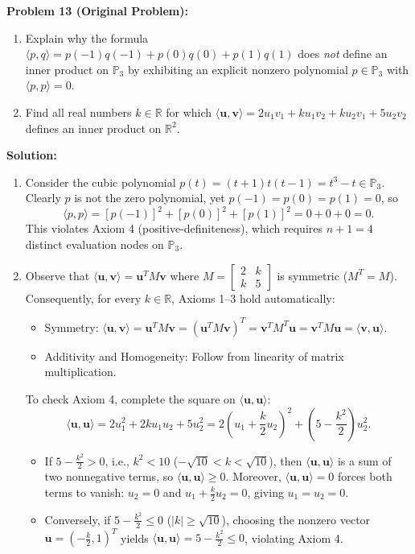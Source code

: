 \documentclass[11pt, letterpaper]{article}
\theoremstyle{definition}
\theoremstyle{remark}
\begin{document}
\medskip

\textbf{Problem 13 (Original Problem):}
\begin{enumerate}[label=(\alph*)]
    \item Explain why the formula $\langle p, q \rangle = p(-1)q(-1) + p(0)q(0) + p(1)q(1)$ does \emph{not} define an inner product on $\mathbb{P}_3$ by exhibiting an explicit nonzero polynomial $p \in \mathbb{P}_3$ with $\langle p, p \rangle = 0$.
    \item Find all real numbers $k \in \mathbb{R}$ for which $\langle \mathbf{u}, \mathbf{v} \rangle = 2u_1v_1 + ku_1v_2 + ku_2v_1 + 5u_2v_2$ defines an inner product on $\mathbb{R}^2$.
\end{enumerate}

\textbf{Solution:}
\begin{enumerate}[label=(\alph*)]
    \item Consider the cubic polynomial $p(t) = (t + 1)t(t - 1) = t^3 - t \in \mathbb{P}_3$. Clearly $p$ is not the zero polynomial, yet $p(-1) = p(0) = p(1) = 0$, so
    \[
    \langle p, p \rangle = [p(-1)]^2 + [p(0)]^2 + [p(1)]^2 = 0 + 0 + 0 = 0.
    \]
    This violates Axiom 4 (positive-definiteness), which requires $n + 1 = 4$ distinct evaluation nodes on $\mathbb{P}_3$.
    \item Observe that $\langle \mathbf{u}, \mathbf{v} \rangle = \mathbf{u}^T M \mathbf{v}$ where $M = \begin{bmatrix} 2 & k \\ k & 5 \end{bmatrix}$ is symmetric ($M^T = M$). Consequently, for every $k \in \mathbb{R}$, Axioms 1--3 hold automatically:
    \begin{itemize}
        \item Symmetry: $\langle \mathbf{u}, \mathbf{v} \rangle = \mathbf{u}^T M \mathbf{v} = (\mathbf{u}^T M \mathbf{v})^T = \mathbf{v}^T M^T \mathbf{u} = \mathbf{v}^T M \mathbf{u} = \langle \mathbf{v}, \mathbf{u} \rangle$.
        \item Additivity and Homogeneity: Follow from linearity of matrix multiplication.
    \end{itemize}
    To check Axiom 4, complete the square on $\langle \mathbf{u}, \mathbf{u} \rangle$:
    \[
    \langle \mathbf{u}, \mathbf{u} \rangle = 2u_1^2 + 2ku_1u_2 + 5u_2^2 = 2\left(u_1 + \frac{k}{2}u_2\right)^2 + \left(5 - \frac{k^2}{2}\right)u_2^2.
    \]
    \begin{itemize}
        \item If $5 - \frac{k^2}{2} > 0$, i.e., $k^2 < 10$ ($-\sqrt{10} < k < \sqrt{10}$), then $\langle \mathbf{u}, \mathbf{u} \rangle$ is a sum of two nonnegative terms, so $\langle \mathbf{u}, \mathbf{u} \rangle \ge 0$. Moreover, $\langle \mathbf{u}, \mathbf{u} \rangle = 0$ forces both terms to vanish: $u_2 = 0$ and $u_1 + \frac{k}{2}u_2 = 0$, giving $u_1 = u_2 = 0$.
        \item Conversely, if $5 - \frac{k^2}{2} \le 0$ ($|k| \ge \sqrt{10}$), choosing the nonzero vector $\mathbf{u} = \left(-\frac{k}{2}, 1\right)^T$ yields $\langle \mathbf{u}, \mathbf{u} \rangle = 5 - \frac{k^2}{2} \le 0$, violating Axiom 4.
    \end{itemize}
\end{enumerate}
\end{document}
